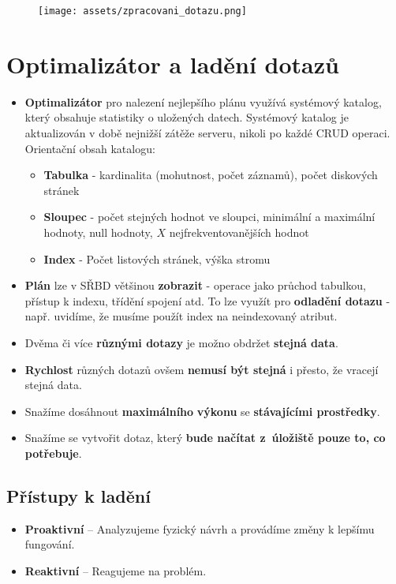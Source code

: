 \begin{figure}[H]
  \centering
  \texttt{[image: assets/zpracovani\_dotazu.png]}
\end{figure}

\section{Optimalizátor a ladění dotazů}
\begin{itemize}
  \item \textbf{Optimalizátor} pro nalezení nejlepšího plánu využívá systémový katalog, který obsahuje statistiky o uložených datech. Systémový katalog je aktualizován v době nejnižší zátěže serveru, nikoli po každé CRUD operaci. Orientační obsah katalogu:
        \begin{itemize}
          \item \textbf{Tabulka} - kardinalita (mohutnost, počet záznamů), počet diskových stránek
          \item \textbf{Sloupec} - počet stejných hodnot ve sloupci, minimální a maximální hodnoty, null hodnoty, $X$ nejfrekventovanějších hodnot
          \item \textbf{Index} - Počet listových stránek, výška stromu
        \end{itemize}
  \item \textbf{Plán} lze v SŘBD většinou \textbf{zobrazit} - operace jako průchod tabulkou, přístup k indexu, třídění spojení atd. To lze využít pro \textbf{odladění dotazu} - např. uvidíme, že musíme použít index na neindexovaný atribut.
  \item Dvěma či více \textbf{různými dotazy} je možno obdržet \textbf{stejná data}.
  \item \textbf{Rychlost} různých dotazů ovšem\textbf{ nemusí být stejná }i přesto, že vracejí stejná data.
  \item Snažíme dosáhnout \textbf{maximálního} \textbf{výkonu} se \textbf{stávajícími prostředky}.
  \item Snažíme se vytvořit dotaz, který\textbf{ bude načítat z úložiště pouze to, co potřebuje}.
\end{itemize}

\subsection{Přístupy k ladění}
\begin{itemize}
  \item \textbf{Proaktivní} -- Analyzujeme fyzický návrh a provádíme změny k lepšímu fungování.
  \item \textbf{Reaktivní} -- Reagujeme na problém.
\end{itemize}

